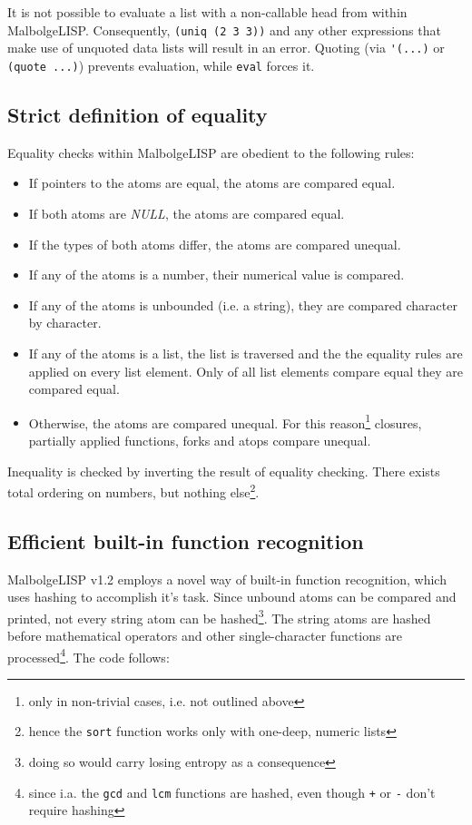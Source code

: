 \par It is not possible to evaluate a list with a non-callable head from within MalbolgeLISP. Consequently, \verb|(uniq (2 3 3))| and any other expressions that make use of unquoted data lists will result in an error. Quoting (via \verb|'(...)| or \verb|(quote ...)|) prevents evaluation, while \verb|eval| forces it.

\subsection{Strict definition of equality}

\par Equality checks within MalbolgeLISP are obedient to the following rules:

\begin{itemize}
    \item If pointers to the atoms are equal, the atoms are compared equal.
    \item If both atoms are \textit{NULL}, the atoms are compared equal.
    \item If the types of both atoms differ, the atoms are compared unequal.
    \item If any of the atoms is a number, their numerical value is compared.
    \item If any of the atoms is unbounded (i.e. a string), they are compared character by character.
    \item If any of the atoms is a list, the list is traversed and the the equality rules are applied on every list element. Only of all list elements compare equal they are compared equal.
    \item Otherwise, the atoms are compared unequal. For this reason\footnote{only in non-trivial cases, i.e. not outlined above} closures, partially applied functions, forks and atops compare unequal.
\end{itemize}

\par Inequality is checked by inverting the result of equality checking. There exists total ordering on numbers, but nothing else\footnote{hence the \verb|sort| function works only with one-deep, numeric lists}.

\subsection{Efficient built-in function recognition}

\par MalbolgeLISP v1.2 employs a novel way of built-in function recognition, which uses hashing to accomplish it's task. Since unbound atoms can be compared and printed, not every string atom can be hashed\footnote{doing so would carry losing entropy as a consequence}. The string atoms are hashed before mathematical operators and other single-character functions are processed\footnote{since i.a. the \verb|gcd| and \verb|lcm| functions are hashed, even though \verb|+| or \verb|-| don't require hashing}. The code follows:

